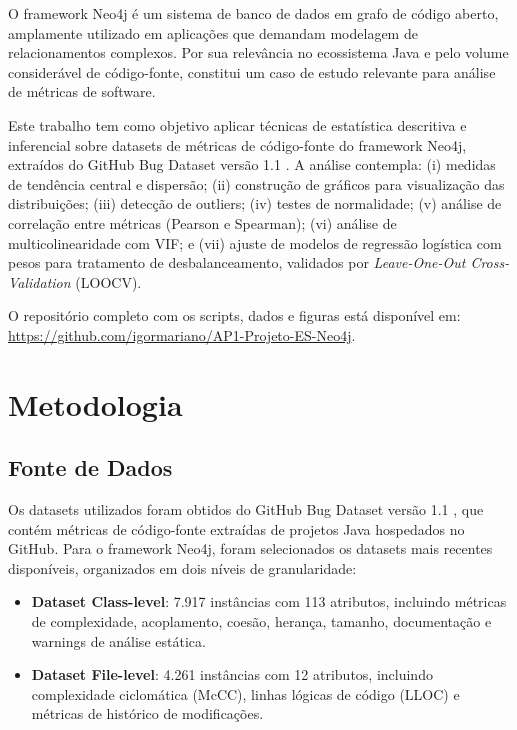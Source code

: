 \documentclass[12pt]{article}
\begin{document}
O framework Neo4j é um sistema de banco de dados em grafo de código aberto, amplamente utilizado em aplicações que demandam modelagem de relacionamentos complexos. Por sua relevância no ecossistema Java e pelo volume considerável de código-fonte, constitui um caso de estudo relevante para análise de métricas de software.

Este trabalho tem como objetivo aplicar técnicas de estatística descritiva e inferencial sobre datasets de métricas de código-fonte do framework Neo4j, extraídos do GitHub Bug Dataset versão 1.1 \cite{toth2016}. A análise contempla: (i) medidas de tendência central e dispersão; (ii) construção de gráficos para visualização das distribuições; (iii) detecção de outliers; (iv) testes de normalidade; (v) análise de correlação entre métricas (Pearson e Spearman); (vi) análise de multicolinearidade com VIF; e (vii) ajuste de modelos de regressão logística com pesos para tratamento de desbalanceamento, validados por \textit{Leave-One-Out Cross-Validation} (LOOCV).

O repositório completo com os scripts, dados e figuras está disponível em: \url{https://github.com/igormariano/AP1-Projeto-ES-Neo4j}.

\section{Metodologia} \label{sec:metodo}

\subsection{Fonte de Dados}

Os datasets utilizados foram obtidos do GitHub Bug Dataset versão 1.1 \cite{toth2016}, que contém métricas de código-fonte extraídas de projetos Java hospedados no GitHub. Para o framework Neo4j, foram selecionados os datasets mais recentes disponíveis, organizados em dois níveis de granularidade:

\begin{itemize}
  \item \textbf{Dataset Class-level}: 7.917 instâncias com 113 atributos, incluindo métricas de complexidade, acoplamento, coesão, herança, tamanho, documentação e warnings de análise estática.
  \item \textbf{Dataset File-level}: 4.261 instâncias com 12 atributos, incluindo complexidade ciclomática (McCC), linhas lógicas de código (LLOC) e métricas de histórico de modificações.
\end{itemize}
\end{document}
